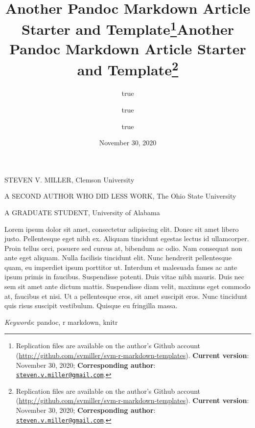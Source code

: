 \documentclass[
      11pt,
                      ]{article}
\title{Another Pandoc Markdown Article
Starter and Template\thanks{Replication files are available on the
author's Github account
(\url{http://github.com/svmiller/svm-r-markdown-templates}).
\textbf{Current version}: November 30, 2020; \textbf{Corresponding
author}:
\href{mailto:steven.v.miller@gmail.com}{\nolinkurl{steven.v.miller@gmail.com}}.}}
\author{true \and true \and true}
\date{November 30, 2020}
\title{Another Pandoc Markdown
Article Starter and Template\thanks{Replication files are available on
the author's Github account
(\url{http://github.com/svmiller/svm-r-markdown-templates}).
\textbf{Current version}: November 30, 2020; \textbf{Corresponding
author}:
\href{mailto:steven.v.miller@gmail.com}{\nolinkurl{steven.v.miller@gmail.com}}.}  }
\date{}
\renewenvironment{abstract}
                  {{%
                    \setlength{\leftmargin}{0mm}
                    \setlength{\rightmargin}{\leftmargin}%
                  }%
                    \relax}
                  {\endlist}
\begin{document}



{%
\setlength{\parindent}{0pt}
\thispagestyle{plain}
{%
\maketitle  %

}




{
   \vskip 13.5pt\relax \normalsize\fontsize{11}{12} 
   \MakeUppercase{\textsf{\large Steven V. Miller}}, \small{Clemson
University}   \par \MakeUppercase{\textsf{\large A Second Author Who Did
Less Work}}, \small{The Ohio State
University}   \par \MakeUppercase{\textsf{\large A Graduate
Student}}, \small{University of Alabama}   

}

}








\begin{abstract}


    \vskip 8.5pt %

\noindent \small{Lorem ipsum dolor sit amet, consectetur adipiscing
elit. Donec sit amet libero justo. Pellentesque eget nibh ex. Aliquam
tincidunt egestas lectus id ullamcorper. Proin tellus orci, posuere sed
cursus at, bibendum ac odio. Nam consequat non ante eget aliquam. Nulla
facilisis tincidunt elit. Nunc hendrerit pellentesque quam, eu imperdiet
ipsum porttitor ut. Interdum et malesuada fames ac ante ipsum primis in
faucibus. Suspendisse potenti. Duis vitae nibh mauris. Duis nec sem sit
amet ante dictum mattis. Suspendisse diam velit, maximus eget commodo
at, faucibus et nisi. Ut a pellentesque eros, sit amet suscipit eros.
Nunc tincidunt quis risus suscipit vestibulum. Quisque eu fringilla
massa.}


\vskip 8.5pt \noindent \emph{Keywords}: pandoc, r markdown, knitr \par




\end{abstract}


\vskip -8.5pt



\setlength{\parindent}{16pt}
\setlength{\parskip}{0pt}
\end{document}
